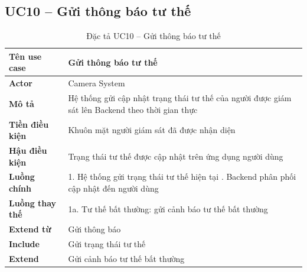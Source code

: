 \subsection*{UC10 -- Gửi thông báo tư thế}
\begin{table}[H]
    \captionsetup{justification=raggedright, singlelinecheck=false}
    \caption{Đặc tả UC10 -- Gửi thông báo tư thế}
\centering
\begin{tabular}{|p{3.5cm}|p{10cm}|}
\hline
\textbf{Tên use case} & Gửi thông báo tư thế \\
\hline
\textbf{Actor} & Camera System \\
\hline
\textbf{Mô tả} & Hệ thống gửi cập nhật trạng thái tư thế
  của người được giám sát lên Backend theo thời gian thực \\
\hline
\textbf{Tiền điều kiện} & Khuôn mặt người giám sát đã được
  nhận diện \\
\hline
\textbf{Hậu điều kiện} & Trạng thái tư thế được cập nhật
  trên ứng dụng người dùng \\
\hline
\textbf{Luồng chính} &
  1. Hệ thống gửi trạng thái tư thế hiện tại \newline
  2. Backend phân phối cập nhật đến người dùng \\
\hline
\textbf{Luồng thay thế} &
  1a. Tư thế bất thường: gửi cảnh báo tư thế
  bất thường \\
\hline
\textbf{Extend từ} & Gửi thông báo \\
\hline
\textbf{Include} & Gửi trạng thái tư thế \\
\hline
\textbf{Extend} & Gửi cảnh báo tư thế bất thường \\
\hline
\end{tabular}
\end{table}

